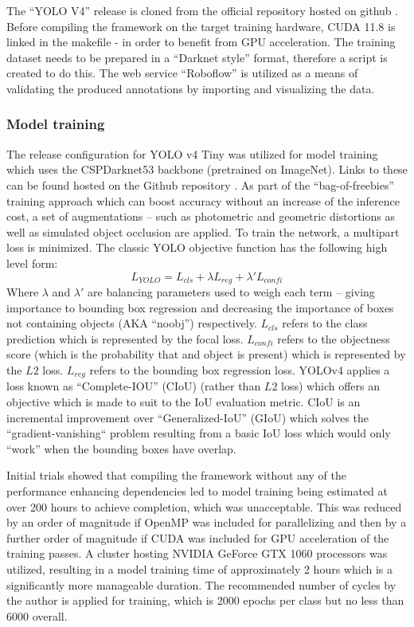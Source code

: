 \documentclass[a4paper,twoside,12pt]{report}
\begin{document}
 The ``YOLO V4'' release is cloned from the official repository hosted on github \citep{yolov4repo}. Before compiling the framework on the target training hardware, CUDA 11.8 is linked in the makefile - in order to benefit from GPU acceleration. The training dataset needs to be prepared in a ``Darknet style'' format, therefore a script is created to do this. The web service ``Roboflow'' \citep{roboflow} is utilized as a means of validating the produced annotations by importing and visualizing the data. 

\subsubsection{Model training}

The release configuration for YOLO v4 Tiny was utilized for model training which uses the CSPDarknet53 backbone (pretrained on ImageNet). Links to these can be found hosted on the Github repository \citep{yolov4repo}. As part of the ``bag-of-freebies'' training approach which can boost accuracy without an increase of the inference cost, a set of augmentations -- such as photometric and geometric distortions as well as simulated object occlusion are applied. To train the network, a multipart loss is minimized. The classic YOLO objective function has the following high level form:
\begin{equation}
L_{YOLO} =  L_{cls} + \lambda L_{reg} + \lambda' L_{confi} 
\end{equation} 
Where $\lambda$ and $\lambda'$ are balancing parameters used to weigh each term -- giving importance to bounding box regression and decreasing the importance of boxes not containing objects (AKA ``noobj'') respectively. $L_{cls} $ refers to the class prediction which is represented by the focal loss. $L_{confi}$ refers to the objectness score (which is the probability that and object is present) which is represented by the $L2$ loss. $L_{reg} $ refers to the bounding box regression loss. YOLOv4 applies a loss known as ``Complete-IOU'' (CIoU) \citep{diouloss} (rather than $L2$ loss) which offers an objective which is made to suit to the IoU evaluation metric. CIoU is an incremental improvement over ``Generalized-IoU'' (GIoU) \citep{giouloss} which solves the ``gradient-vanishing`` problem resulting from a basic IoU loss which would only ``work'' when the bounding boxes have overlap. 

Initial trials showed that compiling the framework without any of the performance enhancing dependencies led to model training being estimated at over 200 hours to achieve completion, which was unacceptable. This was reduced by an order of magnitude if OpenMP was included for parallelizing and then by a further order of magnitude if CUDA was included for GPU acceleration of the training passes. A cluster hosting NVIDIA GeForce GTX 1060 processors was utilized, resulting in a model training time of approximately 2 hours which is a significantly more manageable duration. The recommended number of cycles by the author is applied for training, which is 2000 epochs per class but no less than 6000 overall.
\end{document}
